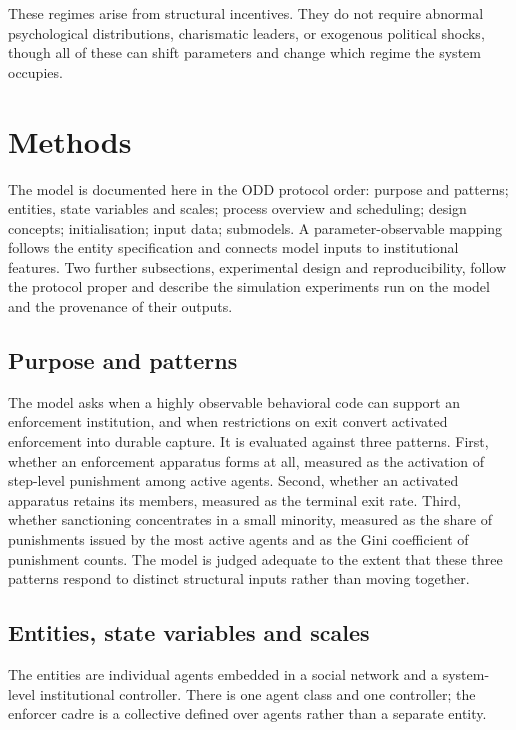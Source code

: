 \documentclass[12pt]{article}
\begin{document}
These regimes arise from structural incentives. They do not require abnormal psychological distributions, charismatic leaders, or exogenous political shocks, though all of these can shift parameters and change which regime the system occupies.



\section{Methods}

The model is documented here in the ODD protocol order: purpose and patterns;
entities, state variables and scales; process overview and scheduling; design
concepts; initialisation; input data; submodels. A parameter-observable mapping
follows the entity specification and connects model inputs to institutional
features. Two further subsections, experimental design and reproducibility,
follow the protocol proper and describe the simulation experiments run on the
model and the provenance of their outputs.

\subsection{Purpose and patterns}

The model asks when a highly observable behavioral code can support an
enforcement institution, and when restrictions on exit convert activated
enforcement into durable capture. It is evaluated against three patterns. First,
whether an enforcement apparatus forms at all, measured as the activation of
step-level punishment among active agents. Second, whether an activated
apparatus retains its members, measured as the terminal exit rate. Third,
whether sanctioning concentrates in a small minority, measured as the share of
punishments issued by the most active agents and as the Gini coefficient of
punishment counts. The model is judged adequate to the extent that these three
patterns respond to distinct structural inputs rather than moving together.

\subsection{Entities, state variables and scales}

The entities are individual agents embedded in a social network and a
system-level institutional controller. There is one agent class and one
controller; the enforcer cadre is a collective defined over agents rather than a
separate entity.
\end{document}
